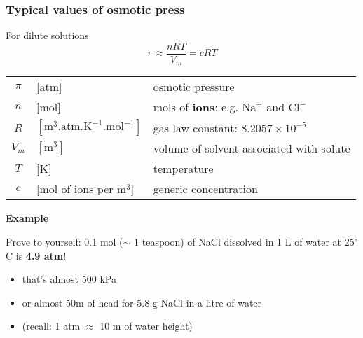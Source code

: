 \begin{frame}\frametitle{Typical values of osmotic press}
	\begin{exampleblock}{For dilute solutions}  %
		\[
			\pi \approx \dfrac{nRT}{V_m} = cRT
		\]
	\end{exampleblock}
	\begin{tabular}{cll}
		$\pi$		&	[atm] 													& osmotic pressure \\
		$n$ 		&  	[mol]													& mols of \textbf{ions}: e.g. $\text{Na}^{+}$ and $\text{Cl}^{-}$\\
		$R$			&	$[\text{m}^3\text{.atm.K}^{-1}\text{.mol}^{-1}]$ 		& gas law constant: $8.2057 \times 10^{-5}$\\
		$V_m$ 		&  	$[\text{m}^{3}]$										& volume of solvent associated with solute\\
		$T$ 		&  	[K]														& temperature\\
		$c$ 		&  	[mol of ions per m$^{3}$]								& generic concentration
	\end{tabular}

	\vspace{12pt}
	\textbf{Example}

	\vspace{6pt}
	Prove to yourself: 0.1 mol ($\sim$ 1 teaspoon) of NaCl dissolved in 1 L of water at 25$^\circ$C is \textbf{4.9 atm}!
	\begin{itemize}
		\item	that's almost 500 kPa
		\item	or almost 50m of head for 5.8 g NaCl in a litre of water
		\item	(recall: 1 atm $\approx$ 10 m of water height)
	\end{itemize}
\end{frame}

